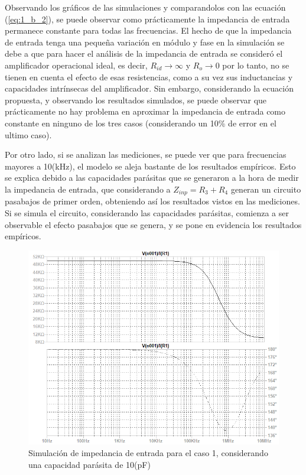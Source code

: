 Observando los gráficos de las simulaciones y comparandolos con las
ecuación (\ref{eq:1_b_2}), se puede observar como prácticamente la
impedancia de entrada permanece constante para todas las frecuencias.
El hecho de que la impedancia de entrada tenga una pequeña variación
en módulo y fase en la simulación se debe a que para hacer el análisis
de la impedancia de entrada se consideró el amplificador operacional
ideal, es decir, $R_{id}\longrightarrow\infty$ y $R_{o}\longrightarrow0$
por lo tanto, no se tienen en cuenta el efecto de esas resistencias,
como a su vez sus inductancias y capacidades intrínsecas del amplificador.
Sin embargo, considerando la ecuación propuesta, y observando los
resultados simulados, se puede observar que prácticamente no hay problema
en aproximar la impedancia de entrada como constante en ninguno de
los tres casos (considerando un 10\% de error en el ultimo caso).

Por otro lado, si se analizan las mediciones, se puede ver que para
frecuencias mayores a 10(kHz), el modelo se aleja bastante de los
resultados empíricos. Esto se explica debido a las capacidades parásitas
que se generaron a la hora de medir la impedancia de entrada, que
considerando a $Z_{inp}=R_{3}+R_{4}$ generan un circuito pasabajos
de primer orden, obteniendo así los resultados vistos en las mediciones.
Si se simula el circuito, considerando las capacidades parásitas,
comienza a ser observable el efecto pasabajos que se genera, y se
pone en evidencia los resultados empíricos.

\begin{figure}[H]
\begin{centering}
\includegraphics[scale=0.5]{../Ex1/ib/Resources1b/zinp1_sim_para}
\par\end{centering}
\begin{centering}
\caption{Simulación de impedancia de entrada para el caso 1, considerando una
capacidad parásita de 10(pF)}
\par\end{centering}
\end{figure}

